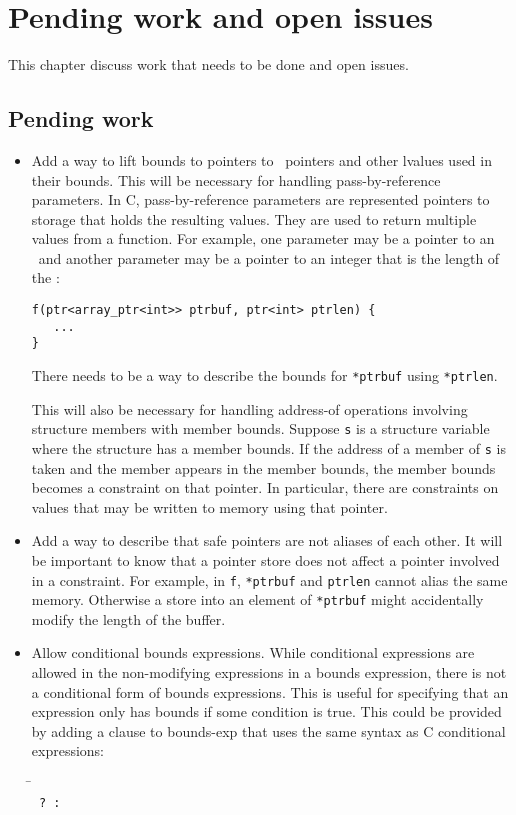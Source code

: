 
\chapter{Pending work and open issues}
\label{chapter:open-issues}

This chapter discuss work that needs to be done and open issues.

\section{Pending work}

\begin{itemize}
\item Add a way to lift bounds to pointers to \arrayptr\ pointers
      and other lvalues used in their bounds.  This will be 
      necessary for handling pass-by-reference parameters.
      In C, pass-by-reference parameters are represented pointers
      to storage that holds the resulting values.  They are
      used to return multiple values from a function.
      For example, one parameter may be a pointer to an 
      \arrayptr\ and another parameter may be a pointer to an 
      integer that is the length of the \arrayptr:
\begin{verbatim}
f(ptr<array_ptr<int>> ptrbuf, ptr<int> ptrlen) {
   ...
}
\end{verbatim}
       There needs to be a way to describe the bounds for
       \texttt{*ptrbuf} using \texttt{*ptrlen}.
       
      This will also be necessary for handling address-of operations
      involving structure members with member bounds.
      Suppose \texttt{s} is a structure variable where the structure 
      has a member bounds. If the address of a member of \texttt{s} is
      taken and the member appears in the member bounds, the member
      bounds becomes a constraint on that pointer.  In particular, 
      there are constraints on values that may be written to memory using 
      that pointer.
\item Add a way to describe that safe pointers are not aliases
      of each other. It will be important to know that a pointer store 
      does not affect a pointer involved in a constraint.  For example,
      in \texttt{f}, \texttt{*ptrbuf} and \texttt{ptrlen} cannot alias 
      the same memory. Otherwise a store into an element of \texttt{*ptrbuf}
      might accidentally  modify the length of the buffer.
\item Allow conditional bounds expressions.   While conditional
expressions are allowed in the non-modifying expressions in a bounds expression, 
there is not a conditional form of bounds expressions.  This is useful for
specifying that an expression only has bounds if some condition is true.
This could be provided by adding a clause to bounds-exp that uses the
same syntax as C conditional expressions:
\begin{tabbing}
\= \\
\>\texttt{ ?  : }
\end{tabbing}


\end{itemize}
